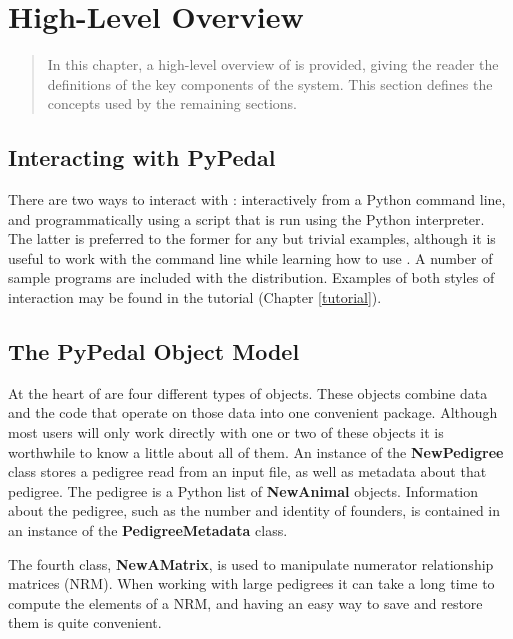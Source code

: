 \chapter{High-Level Overview}
\label{cha:high-level-overview}

\begin{quote}
In this chapter, a high-level overview of \PYPEDAL{} is provided, giving
the reader the definitions of the key components of the system. This section
defines the concepts used by the remaining sections.
\end{quote}

\section{Interacting with PyPedal}
\label{sec:interacting}
There are two ways to interact with \PyPedal{}: interactively from a Python command line, and programmatically using a script that is run using the Python interpreter.  The latter is preferred to the former for any but trivial examples, although it is useful to work with the command line while learning how to use \PyPedal{}.  A number of sample programs are included with the \PyPedal{} distribution.  Examples of both styles of interaction may be found in the tutorial (Chapter \ref{tutorial}).

\section{The PyPedal Object Model}
\label{sec:pypedal-objects}

At the heart of \PyPedal{} are four different types of objects.  These objects
combine data and the code that operate on those data into one convenient package.
Although most \PyPedal{} users will only work directly with one or two of these
objects it is worthwhile to know a little about all of them.  An instance of the
\textbf{NewPedigree} class stores a pedigree read from an input file, as well as
metadata about that pedigree.  The pedigree is a Python list of \textbf{NewAnimal}
objects.  Information about the pedigree, such as the number and identity of founders,
is contained in an instance of the \textbf{PedigreeMetadata} class.

The fourth \PyPedal{} class, \textbf{New{AM}atrix}, is used to manipulate numerator
relationship matrices (NRM).  When working with large pedigrees it can take a long
time to compute the elements of a NRM, and having an easy way to save and restore
them is quite convenient.

